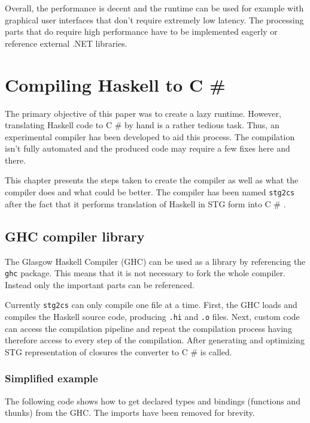 \documentclass[en]{pracamgr}
\newcommand{\shrp}{%
  {\fontfamily{ppl}\selectfont\#%
  }}
\begin{document}
Overall, the performance is decent and the runtime can be used
for example with graphical user interfaces that don't require
extremely low latency. The processing parts that do
require high performance have to be implemented eagerly
or reference external .NET libraries.

\chapter{Compiling Haskell to C\shrp{}}\label{r:compiler}

The primary objective of this paper was to create a lazy runtime.
However, translating Haskell code to C\shrp{} by hand is a rather
tedious task. Thus, an experimental compiler has been developed
to aid this process. The compilation isn't fully automated and
the produced code may require a few fixes here and there.

This chapter presents the steps taken to create the compiler
as well as what the compiler does and what could be better.
The compiler has been named \texttt{stg2cs} after the fact
that it performs translation of Haskell in STG form into C\shrp{}.

\section{GHC compiler library}
The Glasgow Haskell Compiler (GHC) can be used as a library
by referencing the \texttt{ghc} package. This means that
it is not necessary to fork the whole compiler.
Instead only the important parts can be referenced.

Currently \texttt{stg2cs} can only compile one file at a time.
First, the GHC loads and compiles the Haskell source code,
producing \texttt{.hi} and \texttt{.o} files.
Next, custom code can access the compilation pipeline and
repeat the compilation process having therefore access to
every step of the compilation.
After generating and optimizing STG representation of closures
the converter to C\shrp{} is called.

\subsection{Simplified example}
The following code shows how to get declared types and bindings
(functions and thunks) from the GHC. The imports have been removed
for brevity.
\end{document}
